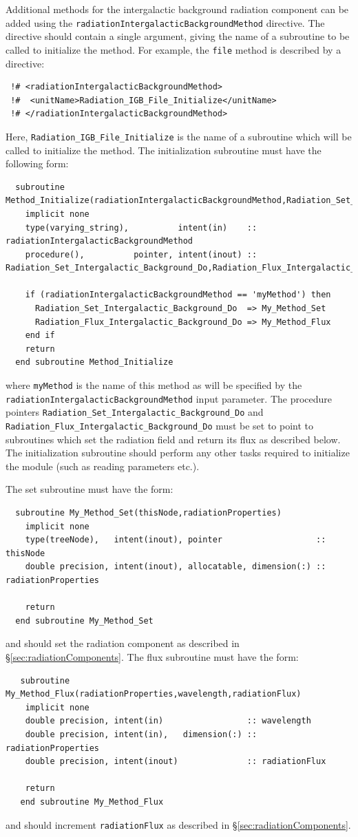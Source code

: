 Additional methods for the intergalactic background radiation component can be added using the {\tt radiationIntergalacticBackgroundMethod} directive. The directive should contain a single argument, giving the name of a subroutine to be called to initialize the method. For example, the {\tt file} method is described by a directive:
\begin{verbatim}
 !# <radiationIntergalacticBackgroundMethod>
 !#  <unitName>Radiation_IGB_File_Initialize</unitName>
 !# </radiationIntergalacticBackgroundMethod>
\end{verbatim}
Here, {\tt Radiation\_IGB\_File\_Initialize} is the name of a subroutine which will be called to initialize the method. The initialization subroutine must have the following form:
\begin{verbatim}
  subroutine Method_Initialize(radiationIntergalacticBackgroundMethod,Radiation_Set_Intergalactic_Background_Do,Radiation_Flux_Intergalactic_Background_Do)
    implicit none
    type(varying_string),          intent(in)    :: radiationIntergalacticBackgroundMethod
    procedure(),          pointer, intent(inout) :: Radiation_Set_Intergalactic_Background_Do,Radiation_Flux_Intergalactic_Background_Do
    
    if (radiationIntergalacticBackgroundMethod == 'myMethod') then
      Radiation_Set_Intergalactic_Background_Do  => My_Method_Set
      Radiation_Flux_Intergalactic_Background_Do => My_Method_Flux
    end if
    return
  end subroutine Method_Initialize
\end{verbatim}
where {\tt myMethod} is the name of this method as will be specified by the {\tt radiationIntergalacticBackgroundMethod} input parameter. The procedure pointers {\tt Radiation\_Set\_Intergalactic\_Background\_Do} and {\tt Radiation\_Flux\_Intergalactic\_Background\_Do} must be set to point to subroutines which set the radiation field and return its flux as described below. The initialization subroutine should perform any other tasks required to initialize the module (such as reading parameters etc.).

The set subroutine must have the form:
\begin{verbatim}
  subroutine My_Method_Set(thisNode,radiationProperties)
    implicit none
    type(treeNode),   intent(inout), pointer                   :: thisNode
    double precision, intent(inout), allocatable, dimension(:) :: radiationProperties

    return
  end subroutine My_Method_Set
\end{verbatim}
and should set the radiation component as described in \S\ref{sec:radiationComponents}. The flux subroutine must have the form:
\begin{verbatim}
   subroutine My_Method_Flux(radiationProperties,wavelength,radiationFlux)
    implicit none
    double precision, intent(in)                 :: wavelength
    double precision, intent(in),   dimension(:) :: radiationProperties
    double precision, intent(inout)              :: radiationFlux

    return
   end subroutine My_Method_Flux
\end{verbatim}
and should increment {\tt radiationFlux} as described in \S\ref{sec:radiationComponents}.

